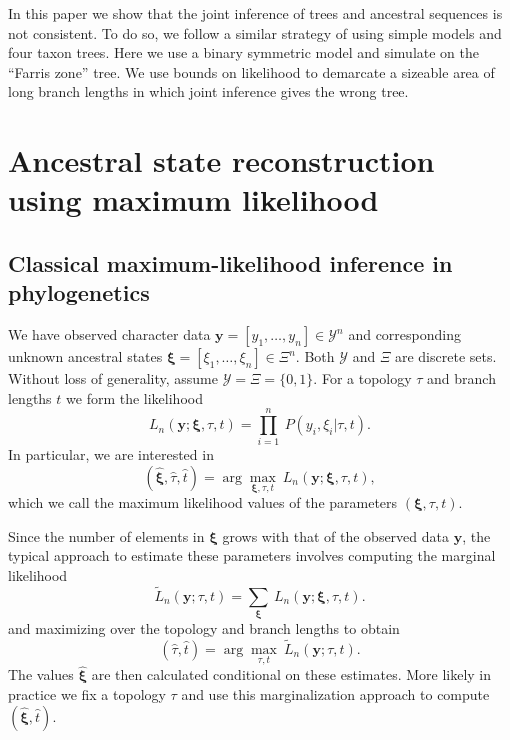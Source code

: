 \documentclass[a4paper]{article}
\begin{document}
In this paper we show that the joint inference of trees and ancestral sequences is not consistent.
To do so, we follow a similar strategy of using simple models and four taxon trees.
Here we use a binary symmetric model and simulate on the ``Farris zone'' \cite{Siddall1998-hq} tree.
We use bounds on likelihood to demarcate a sizeable area of long branch lengths in which joint inference gives the wrong tree.


\section{Ancestral state reconstruction using maximum likelihood}

\subsection{Classical maximum-likelihood inference in phylogenetics}

We have observed character data $\mathbf{y}=[y_1,\ldots,y_n]\in\mathcal{Y}^n$ and corresponding unknown ancestral states $\boldsymbol\xi=[\xi_1,\ldots,\xi_n]\in\Xi^n$.
Both $\mathcal{Y}$ and $\Xi$ are discrete sets.
Without loss of generality, assume $\mathcal{Y}=\Xi=\{0,1\}$.
For a topology $\tau$ and branch lengths $t$ we form the likelihood
\begin{equation}
\label{eq:full_likelihood}
L_n(\mathbf{y};\boldsymbol\xi, \tau, t) = \prod_{i=1}^{n} \ P(y_i, \xi_i | \tau, t).
\end{equation}
In particular, we are interested in
$$
(\hat{\boldsymbol\xi}, \hat{\tau}, \hat{t}) = \arg\max_{\boldsymbol\xi, \tau, t} \ L_n(\mathbf{y};\boldsymbol\xi, \tau, t),
$$
which we call the maximum likelihood values of the parameters $(\boldsymbol\xi, \tau, t)$.

Since the number of elements in $\boldsymbol\xi$ grows with that of the observed data $\mathbf{y}$, the typical approach to estimate these parameters involves computing the marginal likelihood
\begin{equation}
\label{eq:marginal_likelihood}
\tilde{L}_n(\mathbf{y}; \tau, t) = \sum_{\boldsymbol\xi} \ L_n(\mathbf{y};\boldsymbol\xi, \tau, t).
\end{equation}
and maximizing over the topology and branch lengths to obtain
$$
(\hat{\tau}, \hat{t}) = \arg\max_{\tau, t} \  \tilde{L}_n(\mathbf{y}; \tau, t).
$$
The values $\hat{\boldsymbol\xi}$ are then calculated conditional on these estimates.
More likely in practice we fix a topology $\tau$ and use this marginalization approach to compute $(\hat{\boldsymbol\xi}, \hat{t})$.
\end{document}
